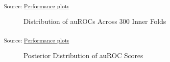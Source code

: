 \documentclass[
  letterpaper,
  DIV=11,
  numbers=noendperiod]{scrartcl}
\begin{document}
\textsubscript{Source:
\href{https://jjcurtin.github.io/study_messages/notebooks/fig_auroc-preview.html\#cell-fig-auroc}{Performance
plots}}

\begin{figure}[H]


\caption{\label{fig-auroc_hist}Distribution of auROCs Across 300 Inner
Folds}

\end{figure}%

\textsubscript{Source:
\href{https://jjcurtin.github.io/study_messages/notebooks/fig_auroc-preview.html\#cell-fig-auroc_hist}{Performance
plots}}

\begin{figure}[H]


\caption{\label{fig-auroc_posterior}Posterior Distribution of auROC
Scores}

\end{figure}%
\end{document}

